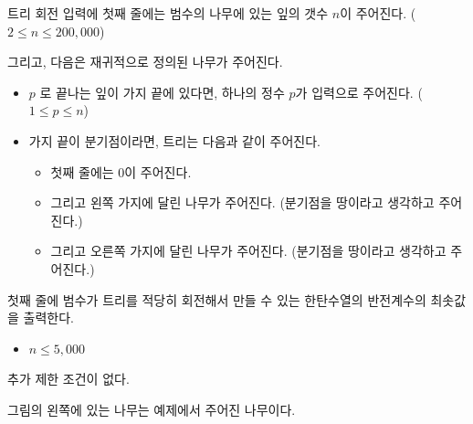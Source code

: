 \begin{problem}{트리 회전}
	입력에 첫째 줄에는 범수의 나무에 있는 잎의 갯수 $n$이 주어진다. ($2 \le n \le 200,000$)
	
	그리고, 다음은 재귀적으로 정의된 나무가 주어진다.
	
	\begin{itemize}
		\item $p$ 로 끝나는 잎이 가지 끝에 있다면, 하나의 정수 $p$가 입력으로 주어진다. ($1 \le p \le n$)
		\item 가지 끝이 분기점이라면, 트리는 다음과 같이 주어진다.
		\begin{itemize}
			\item 첫째 줄에는 0이 주어진다.
			\item 그리고 왼쪽 가지에 달린 나무가 주어진다. (분기점을 땅이라고 생각하고 주어진다.)			\item 그리고 오른쪽 가지에 달린 나무가 주어진다. (분기점을 땅이라고 생각하고 주어진다.)
		\end{itemize}
	\end{itemize}
	

	
	\OutputFile
	
	첫째 줄에 범수가 트리를 적당히 회전해서 만들 수 있는 한탄수열의 반전계수의 최솟값을 출력한다.
	
	\begin{itemize}
		\item $n \le 5,000$
	\end{itemize}
	
	
	추가 제한 조건이 없다.
	
	\Examples
		
	\begin{example}
	\end{example}

	\Note
	
	그림의 왼쪽에 있는 나무는 예제에서 주어진 나무이다.
	
\end{problem}

